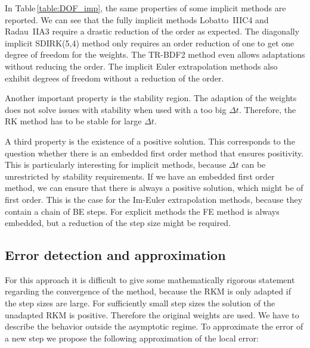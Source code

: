 \documentclass[a4paper]{article}
\numberwithin{equation}{section}
\theoremstyle{plain}
\theoremstyle{definition}
\numberwithin{theorem}{section}
\newcommand{\dt}{{\Delta t}}
\newcommand{\1}{\mathbbm{1}}
\begin{document}
In Table\,\ref{table:DOF_imp}, the same properties of some implicit
methods are reported.
We can see that the fully implicit methods Lobatto~IIIC4 and Radau~IIA3 require a drastic reduction of the order as expected.
The diagonally implicit SDIRK(5,4) method only requires an order reduction of one to get one degree of freedom for the weights.
The TR-BDF2 method even allows adaptations without reducing the order.  
The implicit Euler extrapolation methods also exhibit degrees of freedom without a reduction of the order.

Another important property is the stability region. 
The adaption of the weights does not solve issues with stability when used with a too big $\dt$. Therefore, the RK method has to be stable for large $\dt$.


A third property is the existence of a positive solution. This corresponds to the question whether there is an embedded first order method that ensures positivity. This is particularly interesting for implicit methods, because $\dt$ can be unrestricted by stability requirements.
If we have an embedded first order method, we can ensure that there is always a positive solution, which might be of first order.
This is the case for the Im-Euler extrapolation methods, because they contain a chain of BE steps. 
For explicit methods the FE method is always embedded, but a reduction of the step size might be required. 

\subsection{Error detection and approximation}\label{sec:error}
For this approach it is difficult to give some mathematically rigorous statement regarding the convergence of the method, because the RKM is only adapted if the step sizes are large. 
For sufficiently small step sizes the solution of the unadapted RKM is positive. Therefore the original weights are used.
We have to describe the behavior outside the asymptotic regime.
To approximate the error of a new step we propose the following approximation of the local error:
\end{document}
